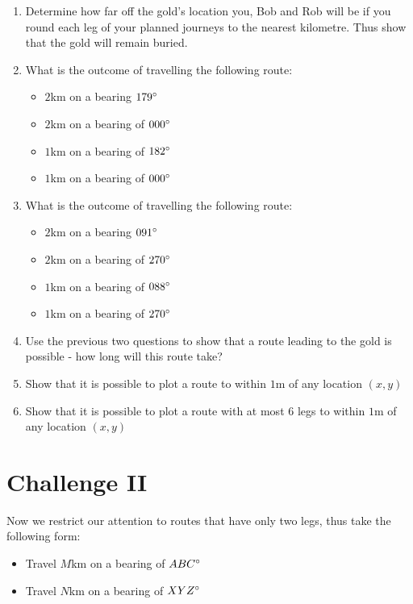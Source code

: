 \documentclass{article}
\begin{document}
\begin{enumerate}
    \item Determine how far off the gold's location you, Bob and Rob will be if you round each leg of your planned journeys to the nearest kilometre. Thus show that the gold will remain buried.
    \item What is the outcome of travelling the following route:
    \begin{itemize}
    \item $2$km on a bearing $179\degree$
    \item $2$km on a bearing of $000\degree$
    \item $1$km on a bearing of $182\degree$ 
    \item $1$km on a bearing of $000\degree$
    \end{itemize}
    \item What is the outcome of travelling the following route:
    \begin{itemize}
        \item $2$km on a bearing $091\degree$
        \item $2$km on a bearing of $270\degree$
        \item $1$km on a bearing of $088\degree$
        \item  $1$km on a bearing of $270\degree$
    \end{itemize}
    \item Use the previous two questions to show that a route leading to the gold is possible - how long will this route take?
    \item Show that it is possible to plot a route to within $1$m of any location $(x,y)$
    \item Show that it is possible to plot a route with at most $6$ legs to within $1$m of any location $(x,y)$
\end{enumerate}

\vspace{1em}
\section{Challenge II}

Now we restrict our attention to routes that have only two legs, thus take the following form:

\begin{itemize}
    \item Travel $M$km on a bearing of $ABC\degree$
    \item Travel $N$km on a bearing of $XYZ\degree$
\end{itemize}
\end{document}
